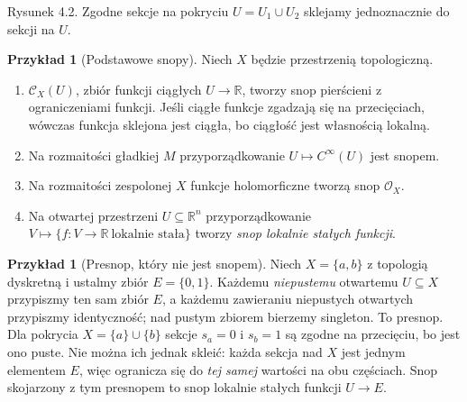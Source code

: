 \documentclass[11pt,a4paper,openany]{report}
\numberwithin{equation}{section}
\theoremstyle{plain}
\theoremstyle{definition}
\newtheorem{przyklad}[twierdzenie]{Przykład}
\theoremstyle{remark}
\newcommand{\R}{\mathbb R}
\begin{document}
\begin{center}

{\small Rysunek 4.2. Zgodne sekcje na pokryciu $U=U_1\cup U_2$ sklejamy jednoznacznie do sekcji na $U$.}\par
\end{center}

\begin{przyklad}[Podstawowe snopy]
Niech $X$ będzie przestrzenią topologiczną.
\begin{enumerate}[label=\alph*)]
\item $\mathcal C_X(U)$, zbiór funkcji ciągłych $U\to\R$,
tworzy snop pierścieni z ograniczeniami funkcji.
Jeśli ciągłe funkcje zgadzają się na przecięciach,
wówczas funkcja sklejona jest ciągła, bo ciągłość
jest własnością lokalną.
\item Na rozmaitości gładkiej $M$ przyporządkowanie
$U\mapsto C^\infty(U)$ jest snopem.
\item Na rozmaitości zespolonej $X$ funkcje holomorficzne
tworzą snop $\mathcal O_X$.
\item Na otwartej przestrzeni $U\subseteq\R^n$ przyporządkowanie
$V\mapsto\{f:V\to\R\ \text{lokalnie stała}\}$
tworzy \emph{snop lokalnie stałych funkcji}.
\end{enumerate}
\end{przyklad}

\begin{przyklad}[Presnop, który nie jest snopem]
\label{prz:presheaf-not-sheaf}
Niech $X=\{a,b\}$ z topologią dyskretną i ustalmy
zbiór $E=\{0,1\}$. Każdemu \emph{niepustemu}
otwartemu $U\subseteq X$ przypiszmy ten sam zbiór $E$,
a każdemu zawieraniu niepustych otwartych przypiszmy
identyczność; nad pustym zbiorem bierzemy singleton.
To presnop. Dla pokrycia $X=\{a\}\cup\{b\}$
sekcje $s_a=0$ i $s_b=1$ są zgodne na przecięciu,
bo jest ono puste. Nie można ich jednak skleić:
każda sekcja nad $X$ jest jednym elementem $E$,
więc ogranicza się do \emph{tej samej} wartości
na obu częściach. Snop skojarzony z tym presnopem
to snop lokalnie stałych funkcji $U\to E$.
\end{przyklad}
\end{document}
